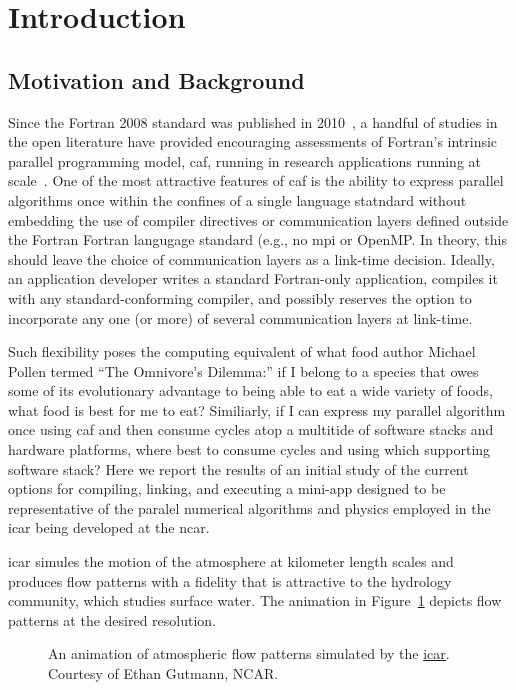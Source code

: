 \section{Introduction}
\subsection{Motivation and Background}
Since the Fortran 2008 standard was published in 2010~\cite{iso2010fortran}, a handful of studies in the open literature
have provided encouraging assessments of Fortran's intrinsic parallel programming model, \gls{caf}, running in research
applications running at scale~\cite{preissl2011multithreaded,garain2015comparing,mozdzynski2015partitioned}.   One of the
most attractive features of \gls{caf} is the ability to express parallel algorithms once within the confines of a single
language statndard without embedding the use of compiler directives or communication layers defined outside the Fortran
Fortran langugage standard (e.g., no \gls{mpi} or OpenMP.  In theory, this should leave the choice of communication layers
as a link-time decision.  Ideally, an application developer writes a standard Fortran-only application, compiles it with any
standard-conforming compiler, and possibly reserves the option to incorporate any one (or more) of several communication layers
at link-time.

Such flexibility poses the computing equivalent of what food author Michael Pollen termed ``The Omnivore's Dilemma:'' if I
belong to a species that owes some of its evolutionary advantage to being able to eat a wide variety of foods, what food is
best for me to eat?  Similiarly, if I can express my parallel algorithm once using \gls{caf} and then consume cycles atop a
multitide of software stacks and hardware platforms, where best to consume cycles and using which supporting software stack?
Here we report the results of an initial study of the current options for compiling, linking, and executing a \gls{mini-app}
designed to be representative of the paralel numerical algorithms and physics employed in the \gls{icar} being developed at
the \gls{ncar}.

\gls{icar} simules the motion of the atmosphere at kilometer length scales and produces flow patterns with a fidelity that is
attractive to the hydrology community, which studies surface water.  The animation in Figure~\ref{figure:icar} depicts flow
patterns at the desired resolution.

\begin{figure}
   \vspace{-18pt}
   \vbox{\hspace{-24pt}
   }
   \caption{An animation of atmospheric flow patterns simulated by the \href{https://github.com/gutmann/icar}{\gls{icar}}.
      Courtesy of Ethan Gutmann, NCAR.\label{figure:icar}}
\end{figure}

